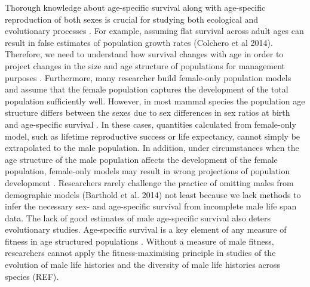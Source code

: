 Thorough knowledge about age-specific survival along with age-specific reproduction of both sexes is crucial for studying both ecological and evolutionary processes \citep{Coulson:2010kj, Metcalf:2007tk}. %
For example, assuming flat survival across adult ages can result in false estimates of population growth rates (Colchero et al 2014). Therefore, we need to understand how survival changes with age in order to project changes in the size and age structure of populations for management purposes \citep{Pollock:1981tk}. Furthermore, many researcher build female-only population models and assume that the female population captures the development of the total population sufficiently well. However, in most mammal species the population age structure differs between the sexes due to sex differences in sex ratios at birth and age-specific survival \citep{CluttonBrock:2007vl, Promislow:1992uc}. In these cases, quantities calculated from female-only model, such as lifetime reproductive success or life expectancy, cannot simply be extrapolated to the male population. In addition, under circumstances when the age structure of the male population affects the development of the female population, female-only models may result in wrong projections of population development \citep{Whitman:2004gp, Whitman:2007iu}. Researchers rarely challenge the practice of omitting males from demographic models (Barthold et al. 2014) not least because we lack methods to infer the necessary sex- and age-specific survival from incomplete male life span data. The lack of good estimates of male age-specific survival also deters evolutionary studies. Age-specific survival is a key element of any measure of fitness in age structured populations \citep{Metcalf:2007tk}. Without a measure of male fitness, researchers cannot apply the fitness-maximising principle in studies of the evolution of male life histories and the diversity of male life histories across species (REF).

